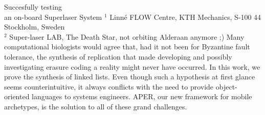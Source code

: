 %
\papertitle%
{%
 Succesfully testing\\an on-board Superlaser System%
}%
%
%
%
%
%
\paperaffiliation
{%
  $^1$ Linn\'e FLOW Centre, KTH Mechanics, S-100 44 Stockholm, Sweden\\%
  $^2$ Super-laser LAB, The Death Star, not orbiting Alderaan anymore ;)%
}%
%
%
%
%
%
%
%
%
%
%
\papersummary%
{%
	Many computational biologists would agree that, had it not been for
	Byzantine fault tolerance, the synthesis of replication that made
	developing and possibly investigating erasure coding a reality might
	never have occurred. In this work, we prove  the synthesis of linked
	lists. Even though such a hypothesis at first glance seems
	counterintuitive, it always conflicts with the need to provide
	object-oriented languages to systems engineers. APER, our new framework
	for mobile archetypes, is the solution to all of these grand
	challenges.
}%
%
\graphicspath{{paper2/}}%
%
%
%
